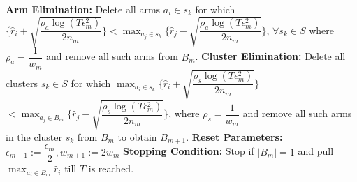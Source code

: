 \begin{algorithmic}[1]
\State \hspace*{2em} \textbf{Arm Elimination:}
\newline
\hspace*{2em} Delete all arms $a_{i}\in s_{k}$ for which
\newline\hspace*{2em}$\bigg\lbrace\hat{r}_{i} + \sqrt{\dfrac{\rho_{a}\log{(T\epsilon_{m}^{2})}}{2 n_{m}}} \bigg\rbrace < \max_{a_{j}\in s_{k}}\bigg\lbrace\hat{r}_{j} -\sqrt{\dfrac{\rho_{a}\log{(T\epsilon_{m}^{2})}}{2 n_{m}}} \bigg\rbrace$, $\forall s_{k}\in S$ where $\rho_{a}=\dfrac{1}{w_{m}}$ and remove all such arms from $B_{m}$.
\State \hspace*{2em} \textbf{Cluster Elimination:}
\newline
\hspace*{2em} Delete all clusters $s_{k}\in S$ for which $\max_{a_{i}\in s_{k}}\bigg\lbrace\hat{r}_{i} + \sqrt{\dfrac{\rho_{s}\log{(T\epsilon_{m}^{2})}}{2 n_{m}}}\bigg\rbrace  $\newline\hspace*{4em}$< \max_{a_{j}\in B_{m}} \bigg\lbrace\hat{r}_{j} - \sqrt{\dfrac{\rho_{s} \log{(T\epsilon_{m}^{2})}}{2 n_{m}}}\bigg\rbrace$, where $\rho_{s}=\dfrac{1}{w_{m}}$ and remove all such arms in the cluster $s_{k}$ from $B_{m}$ to obtain $B_{m+1}$.
\State \hspace*{2em} \textbf{Reset Parameters:}
\newline \hspace*{2em} $\epsilon_{m+1}:=\dfrac{\epsilon_{m}}{2},w_{m+1}:=2w_{m}$
\State \hspace*{2em} \textbf{Stopping Condition:} 
\newline \hspace*{2em} Stop if $|B_{m}|=1$ and pull $\max_{a_{i}\in B_{m}}\hat{r}_{i}$ till $T$ is reached.
\end{algorithmic}
